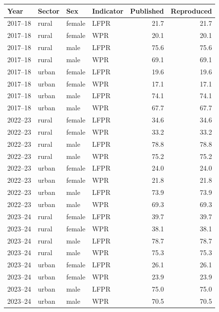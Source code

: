 \begin{tabular}{llllrr}
\toprule
Year & Sector & Sex & Indicator & Published & Reproduced \\
\midrule
2017--18 & rural & female & LFPR & 21.7 & 21.7 \\
2017--18 & rural & female & WPR & 20.1 & 20.1 \\
2017--18 & rural & male & LFPR & 75.6 & 75.6 \\
2017--18 & rural & male & WPR & 69.1 & 69.1 \\
2017--18 & urban & female & LFPR & 19.6 & 19.6 \\
2017--18 & urban & female & WPR & 17.1 & 17.1 \\
2017--18 & urban & male & LFPR & 74.1 & 74.1 \\
2017--18 & urban & male & WPR & 67.7 & 67.7 \\
2022--23 & rural & female & LFPR & 34.6 & 34.6 \\
2022--23 & rural & female & WPR & 33.2 & 33.2 \\
2022--23 & rural & male & LFPR & 78.8 & 78.8 \\
2022--23 & rural & male & WPR & 75.2 & 75.2 \\
2022--23 & urban & female & LFPR & 24.0 & 24.0 \\
2022--23 & urban & female & WPR & 21.8 & 21.8 \\
2022--23 & urban & male & LFPR & 73.9 & 73.9 \\
2022--23 & urban & male & WPR & 69.3 & 69.3 \\
2023--24 & rural & female & LFPR & 39.7 & 39.7 \\
2023--24 & rural & female & WPR & 38.1 & 38.1 \\
2023--24 & rural & male & LFPR & 78.7 & 78.7 \\
2023--24 & rural & male & WPR & 75.3 & 75.3 \\
2023--24 & urban & female & LFPR & 26.1 & 26.1 \\
2023--24 & urban & female & WPR & 23.9 & 23.9 \\
2023--24 & urban & male & LFPR & 75.0 & 75.0 \\
2023--24 & urban & male & WPR & 70.5 & 70.5 \\
\bottomrule
\end{tabular}
